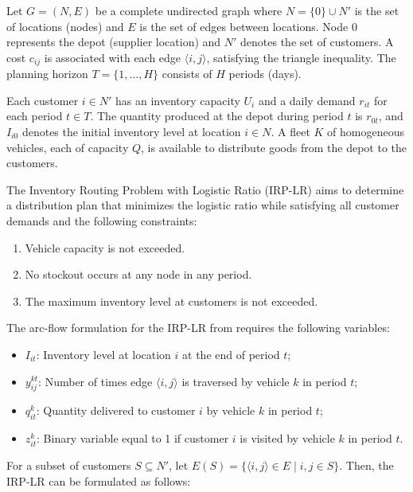 \documentclass{article}
\begin{document}
Let $G = (N, E)$ be a complete undirected graph where $N = \{0\} \cup N'$ is the set of locations (nodes) and $E$ is the set of edges between locations. Node $0$ represents the depot (supplier location) and $N'$ denotes the set of customers. A cost $c_{ij}$ is associated with each edge $\langle i, j \rangle$, satisfying the triangle inequality. The planning horizon $T = \{1, \dots, H\}$ consists of $H$ periods (days). 

Each customer $i \in N'$ has an inventory capacity $U_i$ and a daily demand $r_{it}$ for each period $t \in T$. The quantity produced at the depot during period $t$ is $r_{0t}$, and $I_{i0}$ denotes the initial inventory level at location $i \in N$. A fleet $K$ of homogeneous vehicles, each of capacity $Q$, is available to distribute goods from the depot to the customers.

The Inventory Routing Problem with Logistic Ratio (IRP-LR) aims to determine a distribution plan that minimizes the logistic ratio while satisfying all customer demands and the following constraints:
\begin{enumerate}
    \item Vehicle capacity is not exceeded.
    \item No stockout occurs at any node in any period.
    \item The maximum inventory level at customers is not exceeded.
\end{enumerate}

The arc-flow formulation for the IRP-LR from \cite{archetti2019exact} requires the following variables:
\begin{itemize}
    \item $I_{it}$: Inventory level at location $i$ at the end of period $t$;
    \item $y_{ij}^{kt}$: Number of times edge $\langle i, j \rangle$ is traversed by vehicle $k$ in period $t$;
    \item $q_{it}^k$: Quantity delivered to customer $i$ by vehicle $k$ in period $t$;
    \item $z_{it}^k$: Binary variable equal to 1 if customer $i$ is visited by vehicle $k$ in period $t$.
\end{itemize}

For a subset of customers $S \subseteq N'$, let $E(S) = \{\langle i, j \rangle \in E \mid i, j \in S\}$. Then, the IRP-LR can be formulated as follows:
\end{document}
